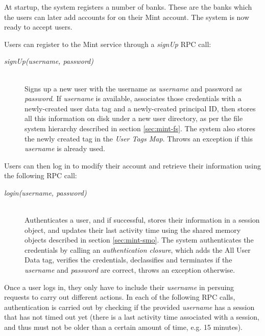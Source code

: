 At startup, the system registers a number of banks. These are the banks which the users can later add accounts for on their Mint account. The system is now ready to accept users.

Users can register to the Mint service through a \emph{signUp} RPC call:

\begin{description}
  \item[\emph{signUp(username, password)}] \ \\
    Signs up a new user with the username as 
    \emph{username} and password as \emph{password}. 
    If \emph{username} is available, associates 
    those credentials with a newly-created user data 
    tag and a newly-created principal ID,
    then stores all this information on disk under
    a new user directory, as per the file system
    hierarchy described in section 
    \ref{sec:mint-fs}. The system
    also stores the newly created tag in the 
    \emph{User Tags Map}.
    Throws an exception if this \emph{username}
    is already used.
\end{description}

Users can then log in to modify their account and retrieve their information using the following RPC call:

\begin{description}
  \item[\emph{login(username, password)}] \ \\
    Authenticates a user, and if successful, 
    stores their information in a session 
    object, and updates their last activity
    time using the shared memory objects
    described in section \ref{sec:mint-smo}.
    The system authenticates the 
    credentials by calling an 
    \emph{authentication closure}, which 
    adds the All User Data tag, 
    verifies the credentials, declassifies 
    and terminates if the \emph{username} and
    \emph{password} are correct, throws 
    an exception otherwise.
\end{description}

Once a user logs in, they only have to include their \emph{username} in persuing requests to carry out different actions. In each of the following RPC calls, authentication is carried out by checking if the provided \emph{username} has a session that has not timed out yet (there is a last activity time associated with a session, and thus must not be older than a certain amount of time, e.g. 15 minutes).

